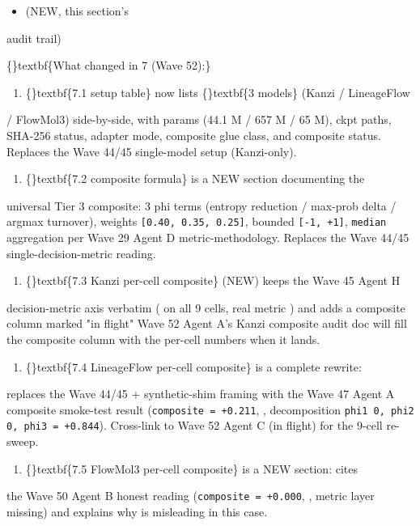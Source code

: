 \documentclass{article}
\begin{document}
\begin{itemize}
\item {} (NEW, this section's
\end{itemize}
audit trail)

\{\}textbf\{What changed in 7 (Wave 52):\}

\begin{enumerate}
\item \{\}textbf\{7.1 setup table\} now lists \{\}textbf\{3 models\} (Kanzi / LineageFlow
\end{enumerate}
/ FlowMol3) side-by-side, with params (44.1 M / 657 M / 65 M), ckpt paths, SHA-256 status, adapter mode, composite glue class, and composite status. Replaces the Wave 44/45 single-model setup (Kanzi-only).

\begin{enumerate}
\item \{\}textbf\{7.2 composite formula\} is a NEW section documenting the
\end{enumerate}
universal Tier 3 composite: 3 phi terms (entropy reduction / max-prob delta / argmax turnover), weights \texttt{[0.40, 0.35, 0.25]}, bounded \texttt{[-1, +1]}, \texttt{median} aggregation per Wave 29 Agent D metric-methodology. Replaces the Wave 44/45 single-decision-metric reading.

\begin{enumerate}
\item \{\}textbf\{7.3 Kanzi per-cell composite\} (NEW) keeps the Wave 45 Agent H
\end{enumerate}
decision-metric axis verbatim ( on all 9 cells, real metric ) and adds a composite column marked "in flight"  Wave 52 Agent A's Kanzi composite audit doc will fill the composite column with the per-cell numbers when it lands.

\begin{enumerate}
\item \{\}textbf\{7.4 LineageFlow per-cell composite\} is a complete rewrite:
\end{enumerate}
replaces the Wave 44/45  + synthetic-shim framing with the Wave 47 Agent A composite smoke-test result (\texttt{composite = +0.211}, , decomposition \texttt{phi1  0, phi2  0, phi3 = +0.844}). Cross-link to Wave 52 Agent C (in flight) for the 9-cell re-sweep.

\begin{enumerate}
\item \{\}textbf\{7.5 FlowMol3 per-cell composite\} is a NEW section: cites
\end{enumerate}
the Wave 50 Agent B honest reading (\texttt{composite = +0.000}, , metric layer missing) and explains why  is misleading in this case.
\end{document}
